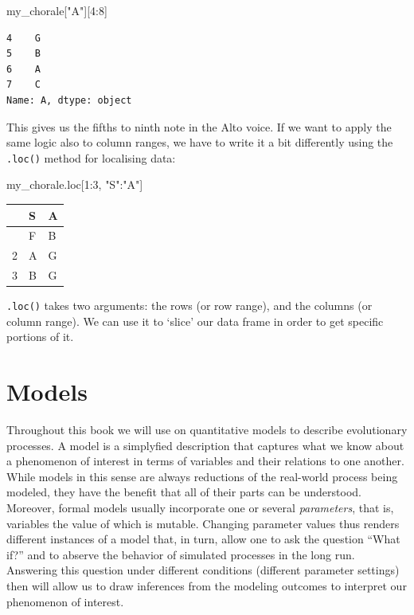 \documentclass[
  a4paperpaper,
  ,captions=tableheading
]{scrbook}
\newenvironment{Shaded}{\begin{snugshade}}{\end{snugshade}}
\newcommand{\DecValTok}[1]{\textcolor[rgb]{0.68,0.00,0.00}{#1}}
\newcommand{\NormalTok}[1]{\textcolor[rgb]{0.00,0.23,0.31}{#1}}
\newcommand{\StringTok}[1]{\textcolor[rgb]{0.13,0.47,0.30}{#1}}
\begin{document}
\begin{Shaded}
\begin{Highlighting}[]
\NormalTok{my\_chorale[}\StringTok{"A"}\NormalTok{][}\DecValTok{4}\NormalTok{:}\DecValTok{8}\NormalTok{]}
\end{Highlighting}
\end{Shaded}

\begin{verbatim}
4    G
5    B
6    A
7    C
Name: A, dtype: object
\end{verbatim}

This gives us the fifths to ninth note in the Alto voice. If we want to
apply the same logic also to column ranges, we have to write it a bit
differently using the \texttt{.loc()} method for localising data:

\begin{Shaded}
\begin{Highlighting}[]
\NormalTok{my\_chorale.loc[}\DecValTok{1}\NormalTok{:}\DecValTok{3}\NormalTok{, }\StringTok{"S"}\NormalTok{:}\StringTok{"A"}\NormalTok{]}
\end{Highlighting}
\end{Shaded}

\begin{longtable}[]{@{}lll@{}}
\toprule\noalign{}
& S & A \\
\midrule\noalign{}
\endhead
\bottomrule\noalign{}
\endlastfoot
1 & F & B \\
2 & A & G \\
3 & B & G \\
\end{longtable}

\texttt{.loc()} takes two arguments: the rows (or row range), and the
columns (or column range). We can use it to `slice' our data frame in
order to get specific portions of it.

\hypertarget{models}{%
\chapter{Models}\label{models}}

Throughout this book we will use on quantitative models to describe
evolutionary processes. A model is a simplyfied description that
captures what we know about a phenomenon of interest in terms of
variables and their relations to one another. While models in this sense
are always reductions of the real-world process being modeled, they have
the benefit that all of their parts can be understood. Moreover, formal
models usually incorporate one or several \emph{parameters}, that is,
variables the value of which is mutable. Changing parameter values thus
renders different instances of a model that, in turn, allow one to ask
the question ``What if?'' and to abserve the behavior of simulated
processes in the long run. Answering this question under different
conditions (different parameter settings) then will allow us to draw
inferences from the modeling outcomes to interpret our phenomenon of
interest.
\end{document}
